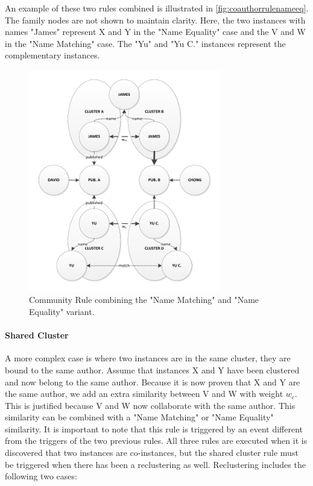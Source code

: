 An example of these two rules combined is illustrated in \autoref{fig:coauthorrulenameeq}. The family nodes are not shown to maintain clarity. Here, the two instances with names "James" represent X and Y in the "Name Equality" case and the V and W in the "Name Matching" case. The "Yu" and "Yu C." instances represent the complementary instances.

\begin{figure}[htb]
	\centering
		\includegraphics[width=0.75\textwidth]{fig/coauthorrulenameeq}
	\caption{Community Rule combining the "Name Matching" and "Name Equality" variant.}
	\label{fig:coauthorrulenameeq}
\end{figure}

\paragraph{Shared Cluster} A more complex case is where two instances are in the same cluster, they are bound to the same author. Assume that instances X and Y have been clustered and now belong to the same author. Because it is now proven that X and Y are the same author, we add an extra similarity between V and W with weight $w_c$. This is justified because V and W now collaborate with the same author. This similarity can be combined with a "Name Matching" or "Name Equality" similarity. It is important to note that this rule is triggered by an event different from the triggers of the two previous rules. All three rules are executed when it is discovered that two instances are co-instances, but the shared cluster rule must be triggered when there has been a reclustering as well. Reclustering includes the following two cases:

